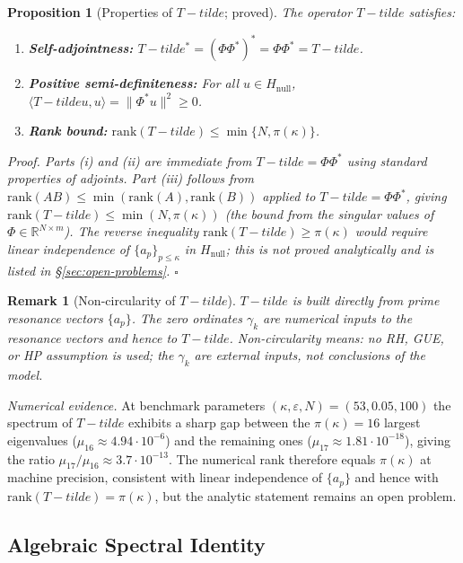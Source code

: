 \documentclass[11pt]{article}
\def\Tt{T-tilde}%
\newtheorem{proposition}[theorem]{Proposition}
\newtheorem*{remark}{Remark}
\newcommand{\Hnull}{H_{\mathrm{null}}}
\newcommand{\Tt}{\widetilde{T}}
\begin{document}
\begin{proposition}[Properties of $\Tt$; proved]\label{prop:Tt-properties}
The operator $\Tt$ satisfies:
\begin{enumerate}[label=(\roman*)]
	\item \textbf{Self-adjointness:}
	$\Tt^* = (\Phi\Phi^*)^* = \Phi\Phi^* = \Tt$.
	\item \textbf{Positive semi-definiteness:}
	For all $u\in\Hnull$,
	$\langle\Tt u,u\rangle = \|\Phi^* u\|^2 \geq 0$.
	\item \textbf{Rank bound:}
	$\mathrm{rank}(\Tt) \leq \min\{N,\pi(\kappa)\}$.
\end{enumerate}
\emph{Proof.}
Parts (i) and (ii) are immediate from $\Tt=\Phi\Phi^*$ using standard
properties of adjoints.
Part (iii) follows from
$\mathrm{rank}(AB)\leq\min(\mathrm{rank}(A),\mathrm{rank}(B))$
applied to $\Tt=\Phi\Phi^*$, giving
$\mathrm{rank}(\Tt)\leq\min(N,\pi(\kappa))$
(the bound from the singular values of $\Phi\in\mathbb{R}^{N\times m}$).
The reverse inequality $\mathrm{rank}(\Tt)\geq\pi(\kappa)$ would require
linear independence of $\{a_p\}_{p\leq\kappa}$ in $\Hnull$; this is
not proved analytically and is listed in \S\ref{sec:open-problems}.
$\square$
\end{proposition}

\begin{remark}[Non-circularity of $\Tt$]
$\Tt$ is built directly from prime resonance vectors $\{a_p\}$.
The zero ordinates $\gamma_k$ are numerical inputs to the resonance
vectors and hence to $\Tt$.
Non-circularity means: no RH, GUE, or HP assumption is used; the
$\gamma_k$ are external inputs, not conclusions of the model.
\end{remark}

\emph{Numerical evidence.} At benchmark parameters
$(\kappa,\varepsilon,N)=(53,0.05,100)$ the spectrum of $\Tt$ exhibits
a sharp gap between the $\pi(\kappa)=16$ largest eigenvalues
($\mu_{16}\approx 4.94\cdot 10^{-6}$) and the remaining ones
($\mu_{17}\approx 1.81\cdot 10^{-18}$), giving the ratio
$\mu_{17}/\mu_{16}\approx 3.7\cdot 10^{-13}$. The numerical rank
therefore equals $\pi(\kappa)$ at machine precision, consistent
with linear independence of $\{a_p\}$ and hence with
$\mathrm{rank}(\Tt)=\pi(\kappa)$, but the analytic statement remains
an open problem.

\subsection{Algebraic Spectral Identity}
\end{document}
